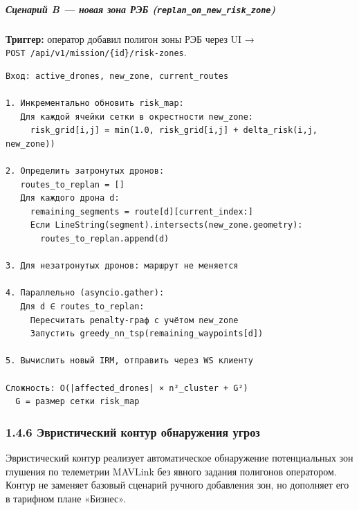 \hypertarget{ux441ux446ux435ux43dux430ux440ux438ux439-b-ux43dux43eux432ux430ux44f-ux437ux43eux43dux430-ux440ux44dux431-replan_on_new_risk_zone}{%
\subparagraph{\texorpdfstring{Сценарий B --- новая зона РЭБ (\texttt{replan\_on\_new\_risk\_zone})}{Сценарий B --- новая зона РЭБ (replan\_on\_new\_risk\_zone)}}\label{ux441ux446ux435ux43dux430ux440ux438ux439-b-ux43dux43eux432ux430ux44f-ux437ux43eux43dux430-ux440ux44dux431-replan_on_new_risk_zone}}

\textbf{Триггер:} оператор добавил полигон зоны РЭБ через UI → \texttt{POST\ /api/v1/mission/\{id\}/risk-zones}.

\begin{verbatim}
Вход: active_drones, new_zone, current_routes

1. Инкрементально обновить risk_map:
   Для каждой ячейки сетки в окрестности new_zone:
     risk_grid[i,j] = min(1.0, risk_grid[i,j] + delta_risk(i,j, new_zone))

2. Определить затронутых дронов:
   routes_to_replan = []
   Для каждого дрона d:
     remaining_segments = route[d][current_index:]
     Если LineString(segment).intersects(new_zone.geometry):
       routes_to_replan.append(d)

3. Для незатронутых дронов: маршрут не меняется

4. Параллельно (asyncio.gather):
   Для d ∈ routes_to_replan:
     Пересчитать penalty-граф с учётом new_zone
     Запустить greedy_nn_tsp(remaining_waypoints[d])

5. Вычислить новый IRM, отправить через WS клиенту

Сложность: O(|affected_drones| × n²_cluster + G²)
  G = размер сетки risk_map
\end{verbatim}

\hypertarget{ux44dux432ux440ux438ux441ux442ux438ux447ux435ux441ux43aux438ux439-ux43aux43eux43dux442ux443ux440-ux43eux431ux43dux430ux440ux443ux436ux435ux43dux438ux44f-ux443ux433ux440ux43eux437}{%
\subsubsection{1.4.6 Эвристический контур обнаружения угроз}\label{ux44dux432ux440ux438ux441ux442ux438ux447ux435ux441ux43aux438ux439-ux43aux43eux43dux442ux443ux440-ux43eux431ux43dux430ux440ux443ux436ux435ux43dux438ux44f-ux443ux433ux440ux43eux437}}

Эвристический контур реализует автоматическое обнаружение потенциальных зон глушения по телеметрии MAVLink без явного задания полигонов оператором. Контур не заменяет базовый сценарий ручного добавления зон, но дополняет его в тарифном плане «Бизнес».


